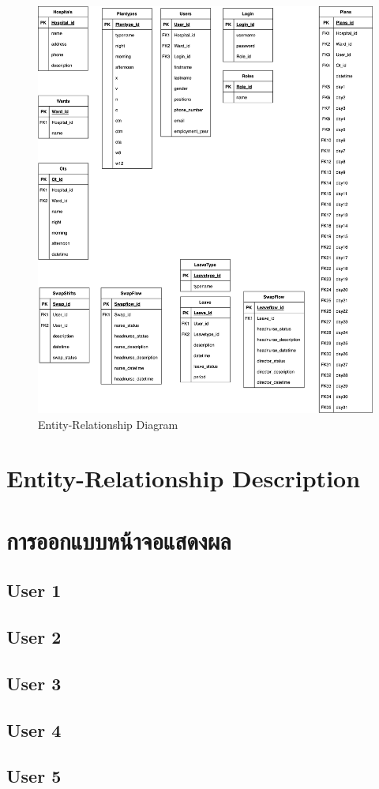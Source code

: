\begin{figure}[h!]
   \centering
   \includegraphics[width=1\textwidth]{ER.png}
   \caption{Entity-Relationship Diagram}
\end{figure}

\section{Entity-Relationship Description}

\section{การออกแบบหน้าจอแสดงผล}

\subsection{User 1}

\subsection{User 2}

\subsection{User 3}

\subsection{User 4}

\subsection{User 5}

